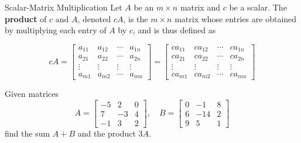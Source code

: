 \begin{definition}{Scalar-Matrix Multiplication}
    Let $A$ be an $m \times n$ matrix and $c$ be a scalar. The \textbf{product} of $c$ and $A$, denoted $cA$, is the $m \times n$ matrix whose entries are obtained by multiplying each entry of $A$ by $c$, and is thus defined as

    $$
    c A=\left[\begin{array}{cccc}
    a_{11} & a_{12} & \cdots & a_{1 n} \\
    a_{21} & a_{22} & \cdots & a_{2 n} \\
    \vdots & \vdots & \vdots & \vdots \\
    a_{m 1} & a_{m 2} & \cdots & a_{m n}
    \end{array}\right] = \left[\begin{array}{cccc}
    c a_{11} & c a_{12} & \cdots & c a_{1 n} \\
    c a_{21} & c a_{22} & \cdots & c a_{2 n} \\
    \vdots & \vdots & \vdots & \vdots \\
    c a_{m 1} & c a_{m 2} & \cdots & c a_{m n}
    \end{array}\right]
    $$
    
\end{definition}

 \begin{example}
    Given matrices
    \[
A=\left[\begin{array}{ccc}
-5 & 2 & 0 \\
7 & -3 & 4 \\
-1 & 3 & 2
\end{array}\right] , \quad
B=\left[\begin{array}{ccc}
0 & -1 & 8 \\
6 & -14 & 2 \\
9 & 5 & 1
\end{array}\right]
\]
    find the sum $A + B$ and the product $3A$.
 \end{example}

